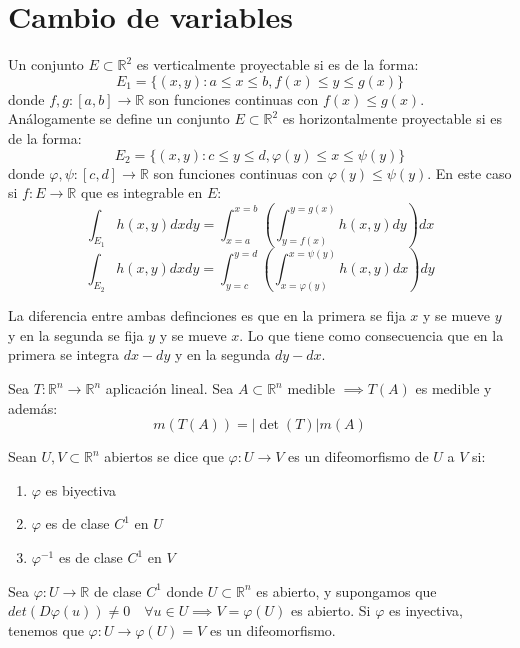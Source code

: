 \section{Cambio de variables}

\begin{definición} 
Un conjunto $E \subset \mathbb{R}^2$ es verticalmente proyectable si es de la forma:
$$E_1 = \{(x,y) : a \leq x \leq b, f(x) \leq y \leq g(x)\}$$ donde $f,g : [a,b] \to \mathbb{R}$ son funciones continuas con $f(x) \leq g(x)$.
Análogamente se define un conjunto $E \subset \mathbb{R}^2$ es horizontalmente proyectable si es de la forma:
$$E_2 = \{ (x,y) : c \leq y \leq d, \varphi(y) \leq x \leq \psi(y)\}$$
donde $\varphi, \psi : [c,d] \to \mathbb{R}$ son funciones continuas con $\varphi(y) \leq \psi(y)$.
En este caso si $f: E \to \mathbb{R}$ que es integrable en $E$:
$$\int_{E_1}h(x,y)dxdy = \int_{x = a}^{x = b}\left(\int_{y=f(x)}^{y=g(x)}h(x,y)dy\right)dx$$
$$\int_{E_2}h(x,y)dxdy = \int_{y = c}^{y = d}\left(\int_{x=\varphi(y)}^{x=\psi(y)}h(x,y)dx\right)dy$$

\end{definición}

\begin{observación}
La diferencia entre ambas definciones es que en la primera se fija $x$ y se mueve $y$ y en la segunda se fija $y$ y se mueve $x$. Lo que tiene como consecuencia que en la primera se integra $dx-dy$ y en la segunda $dy-dx$.
\end{observación}

\begin{teorema}
    Sea $T: \mathbb{R}^n \to \mathbb{R}^n$ aplicación lineal. Sea $A \subset \mathbb{R}^n$ medible $\implies T(A)$ es medible y además:
    \[m(T(A)) = |\det(T)|m(A)\]
\end{teorema}
\begin{definición} 
Sean $U, V \subset \mathbb{R}^n$ abiertos se dice que $\varphi: U \to V$ es un difeomorfismo de $U$ a $V$ si:
\vspace{-0.5em}
\begin{enumerate}
    \item $\varphi$ es biyectiva
    \item $\varphi$ es de clase $C^1$ en $U$
    \item $\varphi^{-1}$ es de clase $C^1$ en $V$
\end{enumerate}
\end{definición}
\begin{observación}
Sea $\varphi: U \to \mathbb{R}$ de clase $C^1$ donde $U \subset \mathbb{R}^n$ es abierto, y supongamos que $det(D\varphi(u)) \neq 0 \quad \forall u \in U \implies V = \varphi(U)$ es abierto. Si $\varphi$ es inyectiva, tenemos que $\varphi: U \to \varphi(U) = V$ es un difeomorfismo.
\end{observación}

